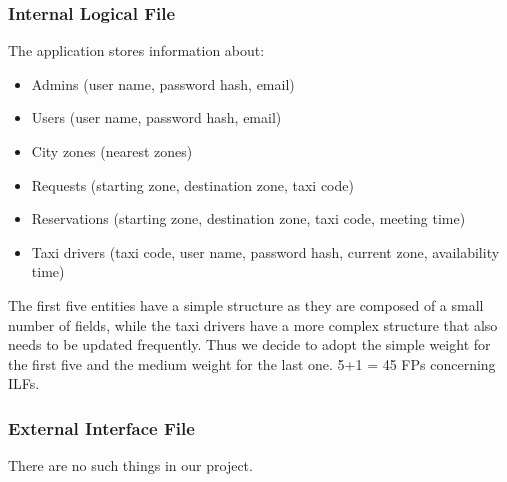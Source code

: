 \documentclass{article}
\begin{document}
\subsubsection{Internal Logical File}
The application stores information about: 
\begin{itemize}
	\item Admins (user name, password hash, email)
	\item Users (user name, password hash, email)
	\item City zones (nearest zones)
	\item Requests (starting zone, destination zone, taxi code)
	\item Reservations (starting zone, destination zone, taxi code, meeting time)
	\item Taxi drivers (taxi code, user name, password hash, current zone, availability time)
\end{itemize}
The first five entities have a simple structure as they are composed 
of a small number of fields, while the taxi drivers have a more complex
structure that also needs to be updated frequently. Thus we decide to 
adopt the simple weight for the first five and the medium weight
for the last one.
5+1 = 45 FPs concerning ILFs.
\subsubsection{External Interface File}
There are no such things in our project.
\end{document}
